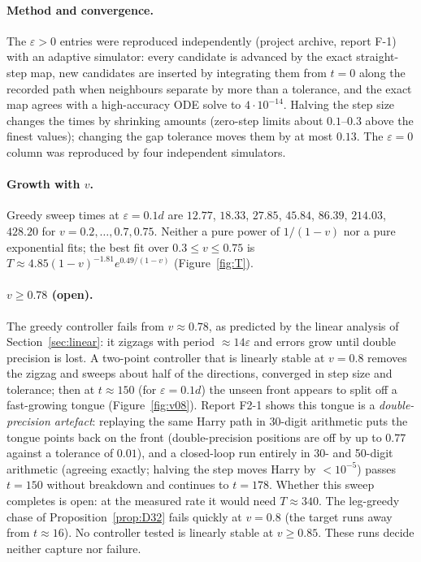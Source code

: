 \documentclass[11pt]{article}
\theoremstyle{remark}\newtheorem{remark}{Remark}
\begin{document}
\paragraph{Method and convergence.} The $\varepsilon>0$ entries were reproduced independently (project archive, report F-1) with an
adaptive simulator: every candidate is advanced by the exact straight-step map, new candidates are inserted by integrating them from
$t=0$ along the recorded path when neighbours separate by more than a tolerance, and the exact map agrees with a high-accuracy ODE
solve to $4\cdot10^{-14}$. Halving the step size changes the times by shrinking amounts (zero-step limits about $0.1$--$0.3$ above the
finest values); changing the gap tolerance moves them by at most $0.13$. The $\varepsilon=0$ column was reproduced by four independent
simulators.

\paragraph{Growth with $v$.} Greedy sweep times at $\varepsilon=0.1d$ are $12.77$, $18.33$, $27.85$, $45.84$, $86.39$, $214.03$, $428.20$ for
$v=0.2,\dots,0.7,0.75$. Neither a pure power of $1/(1-v)$ nor a pure exponential fits; the best fit over $0.3\le v\le0.75$ is
$T\approx4.85(1-v)^{-1.81}e^{0.49/(1-v)}$ (Figure~\ref{fig:T}).

\paragraph{$v\ge0.78$ (open).} The greedy controller fails from $v\approx0.78$, as predicted by the linear analysis of
Section~\ref{sec:linear}: it zigzags with period $\approx14\varepsilon$ and errors grow until double precision is lost. A two-point
controller that is linearly stable at $v=0.8$ removes the zigzag and sweeps about half of the directions, converged in step size
and tolerance; then at $t\approx150$ (for $\varepsilon=0.1d$) the unseen front appears to split off a fast-growing tongue
(Figure~\ref{fig:v08}). Report F2-1 shows this tongue is a \emph{double-precision artefact}: replaying the same Harry path in 30-digit
arithmetic puts the tongue points back on the front (double-precision positions are off by up to $0.77$ against a tolerance of
$0.01$), and a closed-loop run entirely in 30- and 50-digit arithmetic (agreeing exactly; halving the step moves Harry by $<10^{-5}$)
passes $t=150$ without breakdown and continues to $t=178$. Whether this sweep completes is open: at the measured rate it would need
$T\approx340$. The leg-greedy chase of Proposition~\ref{prop:D32} fails quickly at $v=0.8$ (the target runs away from $t\approx16$).
No controller tested is linearly stable at $v\ge0.85$. These runs decide neither capture nor failure.
\end{document}
